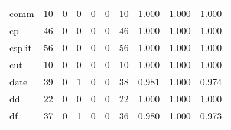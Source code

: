\begin{longtable}{lp{2.0cm}p{2.0cm}p{2.0cm}p{2.0cm}p{2.0cm}p{2.0cm}p{2.0cm}p{2.0cm}p{2.0cm}}
comm      &                     10 &                                             0 &                                            0 &                                           0 &                                            0 &                                         10 &                                1.000 &                                  1.000 &                                1.000 \\
cp        &                     46 &                                             0 &                                            0 &                                           0 &                                            0 &                                         46 &                                1.000 &                                  1.000 &                                1.000 \\
csplit    &                     56 &                                             0 &                                            0 &                                           0 &                                            0 &                                         56 &                                1.000 &                                  1.000 &                                1.000 \\
cut       &                     10 &                                             0 &                                            0 &                                           0 &                                            0 &                                         10 &                                1.000 &                                  1.000 &                                1.000 \\
date      &                     39 &                                             0 &                                            1 &                                           0 &                                            0 &                                         38 &                                0.981 &                                  1.000 &                                0.974 \\
dd        &                     22 &                                             0 &                                            0 &                                           0 &                                            0 &                                         22 &                                1.000 &                                  1.000 &                                1.000 \\
df        &                     37 &                                             0 &                                            1 &                                           0 &                                            0 &                                         36 &                                0.980 &                                  1.000 &                                0.973 \\

\end{longtable}
